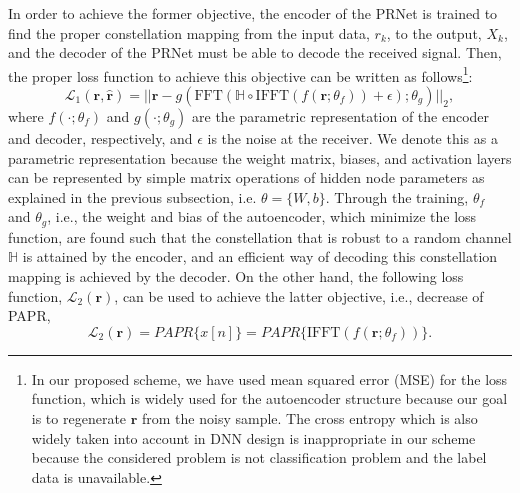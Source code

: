 \documentclass[journal]{IEEEtran}
\begin{document}
In order to achieve the former objective, the encoder of the PRNet is trained to find the proper constellation mapping from the input data, $r_k$, to the output, $X_k$, and the decoder of the PRNet must be able to decode the received signal. Then, the proper loss function to achieve this objective can be written as follows\footnote{In our proposed scheme, we have used mean squared error (MSE) for the loss function, which is widely used for the autoencoder structure because our goal is to regenerate $\boldsymbol{r}$ from the noisy sample. The cross entropy which is also widely taken into account in DNN design is inappropriate in our scheme because the considered problem is not classification problem and the label data is unavailable.}:
\begin{equation}
\mathcal{L}_1(\boldsymbol{r}, \hat{\boldsymbol{r}}) = ||\boldsymbol{r} - g(\text{FFT}(\mathbb{H} \circ \text{IFFT}(f(\boldsymbol{r}; \theta_f)) + \epsilon); \theta_g)||_2 ,
\label{eq5}
\end{equation}
where $f(\cdot; \theta_f)$ and $g(\cdot; \theta_g)$ are the parametric representation of the encoder and decoder, respectively, and $\epsilon$ is the noise at the receiver. We denote this as a parametric representation because the weight matrix, biases, and activation layers can be represented by simple matrix operations of hidden node parameters as explained in the previous subsection, i.e. $\theta = \{W, b\}$. Through the training, $\theta_f$ and $\theta_g$, i.e., the weight and bias of the autoencoder, which minimize the loss function, are found such that the constellation that is robust to a random channel $\mathbb{H}$ is attained by the encoder, and an efficient way of decoding this constellation mapping is achieved by the decoder. On the other hand, the following loss function, $\mathcal{L}_2(\boldsymbol{r})$, can be used to achieve the latter objective, i.e., decrease of PAPR,
\begin{equation}
\mathcal{L}_2(\boldsymbol{r}) = PAPR\{x[n]\} = PAPR\{\text{IFFT}(f(\boldsymbol{r}; \theta_f))\} .
\label{eq6}
\end{equation}
\end{document}
